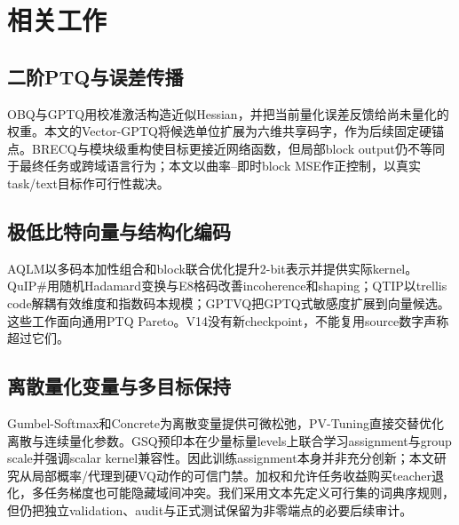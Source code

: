 \section{相关工作}

\subsection{二阶PTQ与误差传播}

OBQ与GPTQ用校准激活构造近似Hessian，并把当前量化误差反馈给尚未量化的权重\cite{obc,gptq}。本文的Vector-GPTQ将候选单位扩展为六维共享码字，作为后续固定硬锚点。BRECQ与模块级重构使目标更接近网络函数\cite{brecq,mrem}，但局部block output仍不等同于最终任务或跨域语言行为；本文以曲率--即时block MSE作正控制，以真实task/text目标作可行性裁决。

\subsection{极低比特向量与结构化编码}

AQLM以多码本加性组合和block联合优化提升2-bit表示并提供实际kernel\cite{aqlm}。QuIP\#用随机Hadamard变换与E8格码改善incoherence和shaping\cite{quipsharp}；QTIP以trellis code解耦有效维度和指数码本规模\cite{qtip}；GPTVQ把GPTQ式敏感度扩展到向量候选\cite{gptvq}。这些工作面向通用PTQ Pareto。V14没有新checkpoint，不能复用source数字声称超过它们。

\subsection{离散量化变量与多目标保持}

Gumbel-Softmax和Concrete为离散变量提供可微松弛\cite{gumbel,concrete}，PV-Tuning直接交替优化离散与连续量化参数\cite{pvtuning}。GSQ预印本在少量标量levels上联合学习assignment与group scale并强调scalar kernel兼容性\cite{gsq}。因此训练assignment本身并非充分创新；本文研究从局部概率/代理到硬VQ动作的可信门禁。加权和允许任务收益购买teacher退化，多任务梯度也可能隐藏域间冲突\cite{pcgrad}。我们采用文本先定义可行集的词典序规则，但仍把独立validation、audit与正式测试保留为非零端点的必要后续审计。
